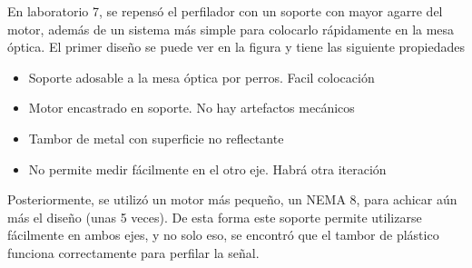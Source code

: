
En laboratorio 7, se repensó el perfilador con un soporte con mayor agarre del motor, además de un sistema más simple para colocarlo rápidamente en la mesa óptica. El primer diseño se puede ver en la figura y tiene las siguiente propiedades
\begin{itemize}
    \item Soporte adosable a la mesa óptica por perros. Facil colocación
    \item Motor encastrado en soporte. No hay artefactos mecánicos
    \item Tambor de metal con superficie no reflectante
    \item No permite medir fácilmente en el otro eje. Habrá otra iteración
\end{itemize}
    
Posteriormente, se utilizó un motor más pequeño, un NEMA 8, para achicar aún más el diseño (unas 5 veces). De esta forma este soporte permite utilizarse fácilmente en ambos ejes, y no solo eso, se encontró que el tambor de plástico funciona correctamente para perfilar la señal.

